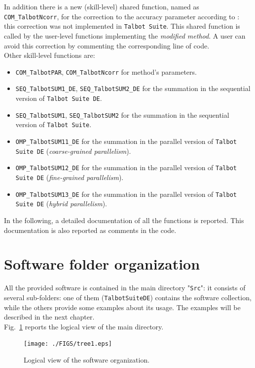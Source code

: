 \documentclass[a4paper,10pt]{report}%
\begin{document}
In addition there is a new (skill-level) shared function, named as {\tt COM\_TalbotNcorr}, for the
correction to the accuracy parameter according to \cite{Talbot:1995}: this correction was not
implemented in {\tt Talbot Suite}. This shared function is called by the user-level functions
implementing the {\em modified method}.
A user can avoid this correction by commenting the corresponding line of code.
\\
Other skill-level functions are:
\begin{itemize}
\item {\tt COM\_TalbotPAR}, {\tt COM\_TalbotNcorr} for method's parameters.
\item {\tt SEQ\_TalbotSUM1\_DE}, {\tt SEQ\_TalbotSUM2\_DE} for the summation in the sequential version of
{\tt Talbot Suite DE}.
\item {\tt SEQ\_TalbotSUM1}, {\tt SEQ\_TalbotSUM2} for the summation in the sequential version of {\tt Talbot Suite}.
\item {\tt OMP\_TalbotSUM11\_DE} for the summation in the parallel version of {\tt Talbot Suite DE} ({\em coarse-grained parallelism}).
\item {\tt OMP\_TalbotSUM12\_DE} for the summation in the parallel version of {\tt Talbot Suite DE} ({\em fine-grained parallelism}).
\item {\tt OMP\_TalbotSUM13\_DE} for the summation in the parallel version of {\tt Talbot Suite DE} ({\em hybrid parallelism}).
\end{itemize}
In the following, a detailed documentation of all the functions is reported.
This documentation is also reported as comments in the code.


\section{Software folder organization}
All the provided software is contained in the main directory "{\tt Src}": it consists of several
sub-folders: one of them ({\tt TalbotSuiteDE}) contains the software collection, while the others
provide some examples about its usage. The examples will be described in the next chapter.
\\
Fig.~\ref{TREE1} reports the logical view of the main directory.
\begin{figure}[htb]
\centering
\texttt{[image: ./FIGS/tree1.eps]}
\caption{Logical view of the software organization.}
\label{TREE1}
\end{figure}
\end{document}

